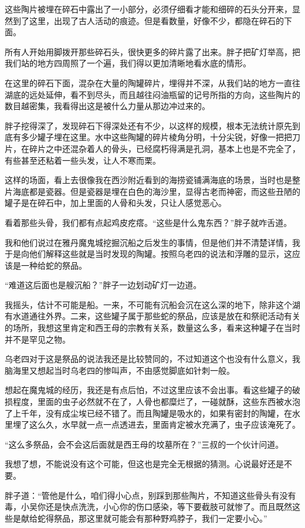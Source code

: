 这些陶片被埋在碎石中露出了一小部分，必须仔细看才能和细碎的石头分开来，显然到了这里，出现了古人活动的痕迹。但是看数量，好像不少，都隐在碎石的下面。

所有人开始用脚拨开那些碎石头，很快更多的碎片露了出来。胖子把矿灯举高，把我们站的地方四周照了一个遍，我们得以更加清晰地看水底的情形。

在这里的碎石下面，混杂在大量的陶罐碎片，埋得并不深，从我们站的地方一直往湖底的远处延伸，看不到尽头，而且越往闷油瓶留的记号所指的方向，这些陶片的数目越密集，我看得出这是被什么力量从那边冲过来的。

胖子挖得深了，发现碎石下得深处还有不少，以这样的规模，根本无法统计原先到底有多少罐子埋在这里。水中这些陶罐的碎片棱角分明，十分尖锐，好像一把把刀片，在碎片之中还混杂着人的骨头，已经腐朽得满是孔洞，基本上也是不完全了，有些甚至还粘着一些头发，让人不寒而栗。

这样的场面，看上去很像我在西沙附近看到的海捞瓷铺满海底的场景，当时也是整片海底都是瓷器。但是瓷器是埋在白色的海沙里，显得古老而神密，而这些丑陋的罐子是在碎石中，加上里面的人骨和头发，只让人感觉恶心。

看着那些头骨，我们都有点起鸡皮疙瘩。“这些是什么鬼东西？”胖子就咋舌道。

我和他们说过在雅丹魔鬼城挖掘沉船之后发生的事情，但是他们并不清楚详情，我于是向他们解释这些就是当时发现的陶罐。按照乌老四的说法和浮雕的显示，这应该是一种给蛇的祭品。

“难道这后面也是艘沉船？”胖子一边划动矿灯一边道。

我摇头，估计不可能是船。一来，不可能有沉船会沉在这么深的地下，除非这个湖有水道通往外界。二来，这些罐子属于那些蛇的祭品，应该是放在和祭祀活动有关的场所，我想这里肯定和西王母的宗教有关系，数量这么多，看来这种罐子在当时并不是罕见之物。

乌老四对于这是祭品的说法我还是比较赞同的，不过知道这个也没有什么意义，我脑海里又想起当时乌老四的惨叫声，不由感觉脚底如针刺一般。

想起在魔鬼城的经历，我还是有点后怕，不过这里应该不会出事。看这些罐子的破损程度，里面的虫子必然就不在了，人骨也都糜烂了，一碰就酥，这些东西被水泡了上千年，没有成尘埃已经不错了。而且陶罐是吸水的，如果有密封的陶罐，在水里埋了这么久，水早就一点一点透进去，里面肯定被水充满了，虫子应该淹死了。

“这么多祭品，会不会这后面就是西王母的坟墓所在？”三叔的一个伙计问道。

我想了想，不能说没有这个可能，但这也是完全无根据的猜测。心说最好还是不要。

胖子道：“管他是什么，咱们得小心点，别踩到那些陶片，不知道这些骨头有没有毒，小吴你还是快点洗洗，小心你的伤口感染，等下要截肢可就惨了。而且既然这些是献给蛇得祭品，那这里就可能会有那种野鸡脖子，我们一定要小心。”

